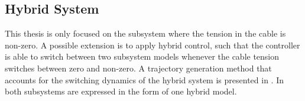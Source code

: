 \subsection{Hybrid System}
This thesis is only focused on the subsystem where the tension in the cable is non-zero. A possible extension is to apply hybrid control, such that the controller is able to switch between two subsystem models whenever the cable tension switches between zero and non-zero. A trajectory generation method that accounts for the switching dynamics of the hybrid system is presented in \cite{Tang2014}. In \cite{Sreenath2013c,Tang2014,Tang2015} both subsystems are expressed in the form of one hybrid model. 